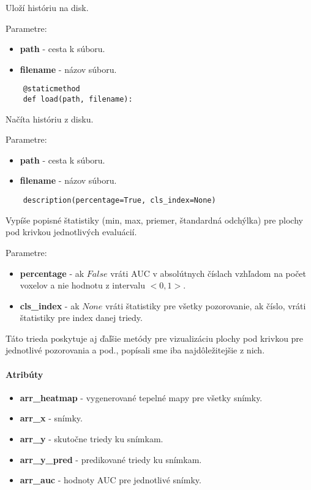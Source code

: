 Uloží históriu na disk.

Parametre:
\begin{itemize}
    \item \textbf{path} - cesta k súboru.
    \item \textbf{filename} - názov súboru.
\end{itemize}

\vspace{24pt}
\begin{lstlisting}
    @staticmethod
    def load(path, filename):
\end{lstlisting}

Načíta históriu z disku.

Parametre:
\begin{itemize}
    \item \textbf{path} - cesta k súboru.
    \item \textbf{filename} - názov súboru.
\end{itemize}

\vspace{24pt}
\begin{lstlisting}
    description(percentage=True, cls_index=None)
\end{lstlisting}

Vypíše popisné štatistiky (min, max, priemer, štandardná odchýlka) pre plochy pod krivkou jednotlivých evaluácií.

Parametre:
\begin{itemize}
    \item \textbf{percentage} - ak $False$ vráti AUC v absolútnych číslach vzhľadom na počet voxelov a nie hodnotu z intervalu $<0, 1>$.
    \item \textbf{cls\_index} - ak $None$ vráti štatistiky pre všetky pozorovanie, ak číslo, vráti štatistiky pre index danej triedy.
\end{itemize}

Táto trieda poskytuje aj ďaľšie metódy pre vizualizáciu plochy pod krivkou pre jednotlivé pozorovania a pod., popísali sme iba najdôležitejšie z nich.

\paragraph{Atribúty}

\begin{itemize}
    \item \textbf{arr\_heatmap} - vygenerované tepelné mapy pre všetky snímky.
    \item \textbf{arr\_x} - snímky.
    \item \textbf{arr\_y} - skutočne triedy ku snímkam.
    \item \textbf{arr\_y\_pred} - predikované triedy ku snímkam.
    \item \textbf{arr\_auc} - hodnoty AUC pre jednotlivé snímky.
\end{itemize}

\thispagestyle{empty}
\mbox{}
\newpage